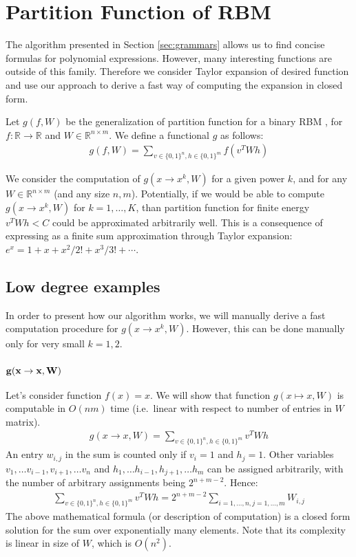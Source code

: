 \section{Partition Function of RBM} \label{partitionfunction}

The algorithm presented in Section
\ref{sec:grammars} allows us to find concise formulas for polynomial expressions.
However, many interesting functions are outside of this
family. Therefore we consider Taylor expansion of desired function
and use our approach to derive a fast way of computing the expansion
in closed form.

Let $g(f, W)$ be the generalization of partition function for a binary
RBM \cite{hinton2002training}, for $f: \mathbb{R} \rightarrow \mathbb{R}$ and $W \in \mathbb{R}^{n \times m}$.
We define a functional $g$ as follows: \\
\begin{gather*}
g(f, W) = \sum_{v \in \{0, 1\}^n, h \in \{0, 1\}^m} f(v^TWh)
\end{gather*}

We consider the computation of $g(x \rightarrow x^k, W)$ for a given power
$k$, and for any $W
\in \mathbb{R}^{n \times m}$ (and any size $n, m$). Potentially, if we would be able
to compute $g(x \rightarrow x^k, W)$ for $k = 1, \dots, K$, than partition
function for finite energy $v^TWh < C$ could be approximated arbitrarily well.
This is a consequence of expressing as a finite sum approximation through
Taylor expansion: $e^{x}=1+x+x^2/2!+x^3/3!+\cdots$.

\subsection{Low degree examples} In order to present how our algorithm works,
we will manually derive a fast computation procedure for $g(x \rightarrow x^k, W)$.
However, this can be done manually only for very small $k = 1, 2$. 


\subsubsection{{$\bf g(x \rightarrow x, W)$}} Let's consider function $f(x) = x$. We
will show that function $g(x \mapsto x, W)$ is computable in $O(nm)$ time
(i.e.~linear with respect to number of entries in $W$ matrix).
\begin{gather*}
	g(x \rightarrow x, W) = \sum_{v \in \{0, 1\}^n, h \in \{0, 1\}^m} v^TWh
\end{gather*}
An entry $w_{i,j}$ in the sum is counted only if $v_i = 1$ and $h_j = 1$. Other variables
$v_1, \dots v_{i-1}, v_{i+1}, \dots v_n$ and $h_1, \dots h_{i-1}, h_{j+1}, \dots h_m$ can be 
assigned arbitrarily, with the number of arbitrary assignments being
$2^{n + m - 2}$. Hence:
\begin{gather*}
	\sum_{v \in \{0, 1\}^n, h \in \{0, 1\}^m} v^TWh = 2^{n + m - 2}\sum_{i = 1, \dots, n, j = 1, \dots, m} W_{i, j}
\end{gather*}
The above mathematical formula (or description of computation) is a
closed form solution for the sum over exponentially many
elements. Note that its complexity is linear in size of $W$, which is $O(n^2)$.


